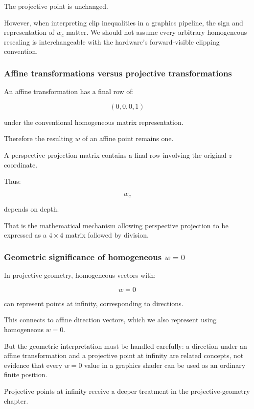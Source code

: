 The projective point is unchanged.

However, when interpreting clip inequalities in a graphics pipeline, the sign and representation of \(w_c\) matter. We should not assume every arbitrary homogeneous rescaling is interchangeable with the hardware's forward-visible clipping convention.

\subsubsection{Affine transformations versus projective transformations}\label{affine-transformations-versus-projective-transformations}

An affine transformation has a final row of:

\[
 (0,0,0,1)
\]

under the conventional homogeneous matrix representation.

Therefore the resulting \(w\) of an affine point remains one.

A perspective projection matrix contains a final row involving the original \(z\) coordinate.

Thus:

\[
 w_c
\]

depends on depth.

That is the mathematical mechanism allowing perspective projection to be expressed as a \(4\times4\) matrix followed by division.

\subsubsection{\texorpdfstring{Geometric significance of homogeneous \(w=0\)}{Geometric significance of homogeneous w=0}}\label{geometric-significance-of-homogeneous-w0}

In projective geometry, homogeneous vectors with:

\[
 w=0
\]

can represent points at infinity, corresponding to directions.

This connects to affine direction vectors, which we also represent using homogeneous \(w=0\).

But the geometric interpretation must be handled carefully: a direction under an affine transformation and a projective point at infinity are related concepts, not evidence that every \(w=0\) value in a graphics shader can be used as an ordinary finite position.

Projective points at infinity receive a deeper treatment in the projective-geometry chapter.


